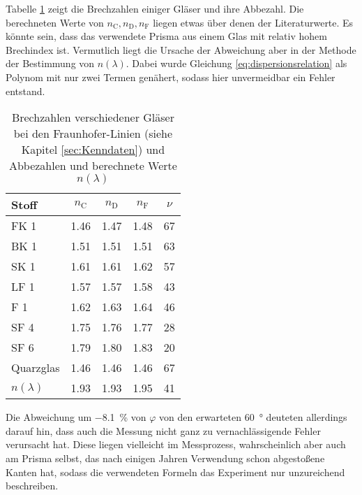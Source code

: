 Tabelle \ref{fig:Vergleichswerte} zeigt die Brechzahlen einiger Gläser und ihre Abbezahl. Die berechneten Werte von $n_\text{C},n_\text{D},n_\text{F}$ liegen etwas über denen der Literaturwerte. Es könnte sein, dass das verwendete Prisma aus einem Glas mit relativ hohem Brechindex ist. Vermutlich liegt die Ursache der Abweichung aber in der Methode der Bestimmung von $n(\lambda)$. Dabei wurde Gleichung \ref{eq:dispersionsrelation} als Polynom mit nur zwei Termen genähert, sodass hier unvermeidbar ein Fehler entstand.
\begin{table}[h!]
\centering
\begin{tabular}{lcccc}
	Stoff & $n_\text{C}$ & $n_\text{D}$ & $n_\text{F}$ & $\nu$ \\
	\hline
	FK 1 & 1.46 & 1.47 & 1.48 & 67 \\
	BK 1 & 1.51 & 1.51 & 1.51 & 63 \\
	SK 1 & 1.61 & 1.61 & 1.62 & 57 \\
	LF 1 & 1.57 & 1.57 & 1.58 & 43 \\
	F 1 & 1.62 & 1.63 & 1.64 & 46 \\
	SF 4 & 1.75 & 1.76 & 1.77 & 28 \\
	SF 6 & 1.79 & 1.80 & 1.83 & 20 \\
	Quarzglas & 1.46 & 1.46 & 1.46 & 67 \\
	\hline
	$n(\lambda)$ & 1.93 & 1.93 & 1.95 & 41
\end{tabular}
\caption{Brechzahlen verschiedener Gläser bei den Fraunhofer-Linien (siehe Kapitel \ref{sec:Kenndaten}) und Abbezahlen \cite[Tabellenanhang Tab. A 4.3]{Walcher} und berechnete Werte $n(\lambda)$}
\label{fig:Vergleichswerte}
\end{table}
Die Abweichung um \SI{-8.1}{\%} von $\varphi$ von den erwarteten \SI{60}{\degree} deuteten allerdings darauf hin, dass auch die Messung nicht ganz zu vernachlässigende Fehler verursacht hat. Diese liegen vielleicht im Messprozess, wahrscheinlich aber auch am Prisma selbst, das nach einigen Jahren Verwendung schon abgestoßene Kanten hat, sodass die verwendeten Formeln das Experiment nur unzureichend beschreiben.